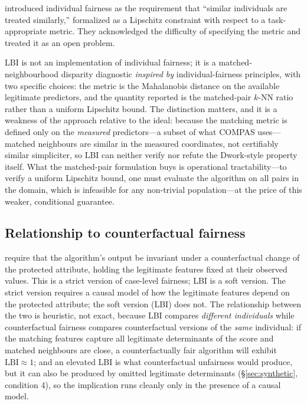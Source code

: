 \documentclass[11pt]{article}
\begin{document}
\citet{dwork2012} introduced individual fairness as the requirement
that ``similar individuals are treated similarly,''
formalized as a Lipschitz constraint with respect to a
task-appropriate metric. They acknowledged the difficulty of
specifying the metric and treated it as an open problem.

LBI is not an implementation of individual fairness; it is a
matched-neighbourhood disparity diagnostic \emph{inspired by}
individual-fairness principles, with two specific choices: the
metric is the Mahalanobis distance on the available legitimate
predictors, and the quantity reported is the matched-pair $k$-NN
ratio rather than a uniform Lipschitz bound. The distinction
matters, and it is a weakness of the approach relative to the ideal:
because the matching metric is defined only on the \emph{measured}
predictors---a subset of what COMPAS uses---matched neighbours are
similar in the measured coordinates, not certifiably similar
simpliciter, so LBI can neither verify nor refute the
Dwork-style property itself. What the matched-pair formulation buys
is operational tractability---to verify a uniform Lipschitz bound,
one must evaluate the algorithm on all pairs in the domain, which is
infeasible for any non-trivial population---at the price of this
weaker, conditional guarantee.

\subsection{Relationship to counterfactual fairness}

\citet{kusner2017} require that the algorithm's output be invariant
under a counterfactual change of the protected attribute, holding
the legitimate features fixed at their observed values. This is a
strict version of case-level fairness; LBI is a soft version. The
strict version requires a causal model of how the legitimate
features depend on the protected attribute; the soft version (LBI)
does not. The relationship between the two is heuristic, not exact,
because LBI compares \emph{different individuals} while
counterfactual fairness compares counterfactual versions of the
\emph{same} individual: if the matching features capture all
legitimate determinants of the score and matched neighbours are
close, a counterfactually fair algorithm will exhibit
$\mathrm{LBI} \approx 1$; and an elevated LBI is what counterfactual
unfairness would produce, but it can also be produced by omitted
legitimate determinants (\S\ref{sec:synthetic}, condition 4), so the
implication runs cleanly only in the presence of a causal model.
\end{document}
